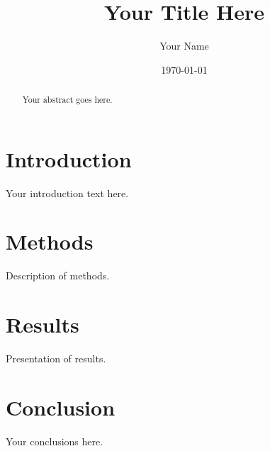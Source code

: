 \documentclass[12pt]{article}
\title{Your Title Here}
\author{Your Name}
\date{\today}
\begin{document}
\maketitle

\begin{abstract}
Your abstract goes here.
\end{abstract}

\section{Introduction}
Your introduction text here.

\section{Methods}
Description of methods.

\section{Results}
Presentation of results.

\section{Conclusion}
Your conclusions here.
\end{document}
